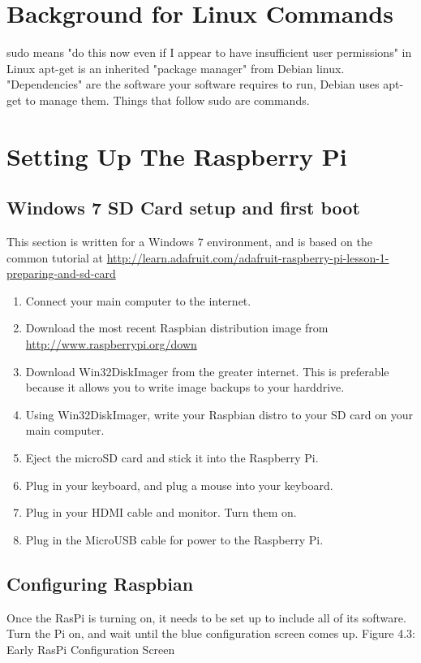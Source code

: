 \section{Background for Linux Commands}
sudo means "do this now even if I appear to have insufficient user permissions" in Linux 
apt-get is an inherited "package manager" from Debian linux. "Dependencies" are the software your software requires to run, Debian uses apt-get to manage them.
Things that follow sudo are commands.

\section{Setting Up The Raspberry Pi}
\subsection{Windows 7 SD Card setup and first boot}
This section is written for a Windows 7 environment, and is based on the common tutorial at \url{http://learn.adafruit.com/adafruit-raspberry-pi-lesson-1-preparing-and-sd-card}
\begin{enumerate}
\item Connect your main computer to the internet.
\item Download the most recent Raspbian distribution image from \url{http://www.raspberrypi.org/down}
\item Download Win32DiskImager from the greater internet. This is preferable because it allows you to write image backups to your harddrive.
\item Using Win32DiskImager, write your Raspbian distro to your SD card on your main computer.
\item Eject the microSD card and stick it into the Raspberry Pi.
\item Plug in your keyboard, and plug a mouse into your keyboard.
\item Plug in your HDMI cable and monitor. Turn them on.
\item Plug in the MicroUSB cable for power to the Raspberry Pi.
\end{enumerate}


\subsection{Configuring Raspbian}
Once the RasPi is turning on, it needs to be set up to include all of its software. Turn the Pi on, and wait until the blue configuration screen comes up.
Figure 4.3: Early RasPi Configuration Screen

